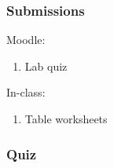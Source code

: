 \documentclass[12pt]{article}
\begin{document}
\subsubsection{Submissions}

Moodle:
\begin{enumerate}
\item Lab quiz
\end{enumerate}

\noindent
In-class:
\begin{enumerate}
\item Table worksheets
\end{enumerate}


\subsubsection{Quiz}
\end{document}
